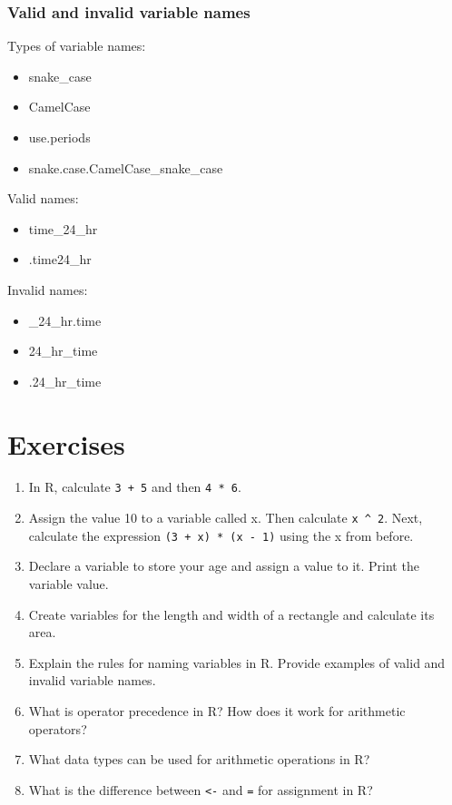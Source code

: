 \documentclass[
  letterpaper,
  DIV=11,
  numbers=noendperiod]{scrreprt}
\providecommand{\tightlist}{%
  \setlength{\itemsep}{0pt}\setlength{\parskip}{0pt}}\usepackage{longtable,booktabs,array}
\begin{document}
\subsubsection{Valid and invalid variable
names}\label{valid-and-invalid-variable-names}

Types of variable names:

\begin{itemize}
\tightlist
\item
  snake\_case
\item
  CamelCase
\item
  use.periods
\item
  snake.case.CamelCase\_snake\_case
\end{itemize}

Valid names:

\begin{itemize}
\item
  time\_24\_hr
\item
  .time24\_hr
\end{itemize}

Invalid names:

\begin{itemize}
\item
  \_24\_hr.time
\item
  24\_hr\_time
\item
  .24\_hr\_time
\end{itemize}

\section{Exercises}\label{exercises-5}

\begin{enumerate}
\def\labelenumi{\roman{enumi}.}
\tightlist
\item
  In R, calculate \texttt{3\ +\ 5} and then \texttt{4\ *\ 6}.
\item
  Assign the value 10 to a variable called x. Then calculate
  \texttt{x\ \^{}\ 2}. Next, calculate the expression
  \texttt{(3\ +\ x)\ *\ (x\ -\ 1)} using the x from before.
\item
  Declare a variable to store your age and assign a value to it. Print
  the variable value.
\item
  Create variables for the length and width of a rectangle and calculate
  its area.
\item
  Explain the rules for naming variables in R. Provide examples of valid
  and invalid variable names.
\item
  What is operator precedence in R? How does it work for arithmetic
  operators?
\item
  What data types can be used for arithmetic operations in R?
\item
  What is the difference between \texttt{\textless{}-} and \texttt{=}
  for assignment in R?
\end{enumerate}
\end{document}
